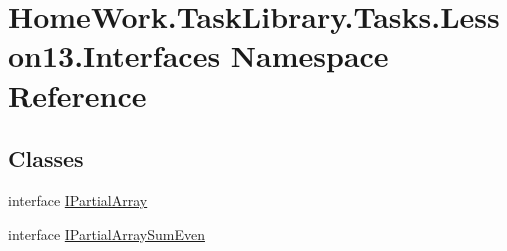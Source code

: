 \hypertarget{namespace_home_work_1_1_task_library_1_1_tasks_1_1_lesson13_1_1_interfaces}{}\section{Home\+Work.\+Task\+Library.\+Tasks.\+Lesson13.\+Interfaces Namespace Reference}
\label{namespace_home_work_1_1_task_library_1_1_tasks_1_1_lesson13_1_1_interfaces}
\subsection*{Classes}
\begin{DoxyCompactItemize}
\item 
interface \mbox{\hyperlink{interface_home_work_1_1_task_library_1_1_tasks_1_1_lesson13_1_1_interfaces_1_1_i_partial_array}{I\+Partial\+Array}}
\item 
interface \mbox{\hyperlink{interface_home_work_1_1_task_library_1_1_tasks_1_1_lesson13_1_1_interfaces_1_1_i_partial_array_sum_even}{I\+Partial\+Array\+Sum\+Even}}
\end{DoxyCompactItemize}
